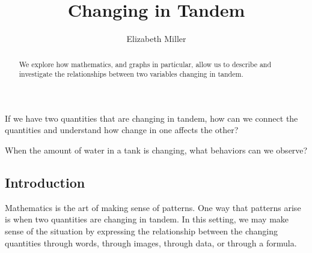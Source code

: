 \documentclass{ximera}
\author{Elizabeth Miller}
\title{Changing in Tandem}
\begin{document}
\begin{abstract}
  We explore how mathematics, and graphs in particular, allow us to describe and investigate the relationships between two variables changing in tandem.
\end{abstract}
\maketitle




\begin{motivatingQuestions}
\item If we have two quantities that are changing in tandem, how can
  we connect the quantities and understand how change in one affects
  the other?
\item When the amount of water in a tank is changing, what behaviors
  can we observe?
\end{motivatingQuestions}



\subsection{Introduction}
Mathematics is the art of making sense of patterns.  One way that patterns arise is when two quantities are changing in tandem.  In this setting, we may make sense of the situation by expressing the relationship between the changing quantities through words, through images, through data, or through a formula.%
\end{document}
